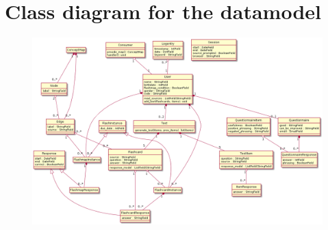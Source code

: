 \section{Class diagram for the datamodel}
\label{app:classdiagram}
\begin{figure}[h!]
\centering
\includegraphics[angle=90,height=\textheight-10ex]{img/classdiagram.png}
\end{figure}
